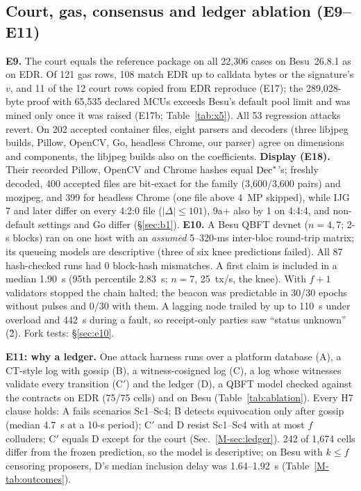 \documentclass[10pt]{article}
\newcommand{\mainref}[1]{\ref{M-#1}}
\begin{document}
\subsection{Court, gas, consensus and ledger ablation (E9--E11)}
\textbf{E9.} The court equals the reference package on all 22,306 cases on Besu~26.8.1 as on EDR. Of 121 gas rows, 108 match EDR up to calldata bytes or the
signature's $v$, and 11 of the 12 court rows copied from EDR reproduce (E17); the 289,028-byte proof with 65,535 declared MCUs exceeds Besu's default pool limit and was mined only once
it was raised (E17b; Table~\ref{tab:x5}). All 53 regression attacks revert. On 202 accepted container files, eight parsers and decoders (three libjpeg builds,
Pillow, OpenCV, Go, headless Chrome, our parser) agree on dimensions and components, the libjpeg builds also on the coefficients. \textbf{Display (E18).} Their recorded Pillow,
OpenCV and Chrome hashes equal $\mathrm{Dec}^{*}$'s; freshly decoded, 400 accepted files are bit-exact for the  family
(3,600/3,600 pairs) and mozjpeg, and 399 for headless Chrome (one file above 4~MP skipped), while IJG 7 and later differ on every 4:2:0 file ($|\Delta|\le101$), 9a+ also by 1 on 4:4:4, and non-default
settings and Go differ (\S\ref{sec:b1}).
\textbf{E10.} A Besu QBFT devnet ($n=4,7$; 2-s blocks) ran on one host with an \emph{assumed} 5--320-ms inter-bloc
round-trip matrix; its queueing models are descriptive (three of six knee predictions
failed). All 87 hash-checked runs had 0 block-hash mismatches. A first claim is included in a median 1.90~s (95th
percentile 2.83~s; $n=7$, 25~tx/s, the knee). With $f+1$ validators stopped the chain halted; the beacon was predictable
in 30/30 epochs without pulses and 0/30 with them. A lagging node trailed by up to 110~s under overload and 442~s
during a fault, so receipt-only parties saw ``status unknown'' (\G{2}). Fork tests: \S\ref{sec:e10}.

\textbf{E11: why a ledger.} One attack harness runs over a platform database (A), a CT-style log with gossip (B), a witness-cosigned log (C), a log
whose witnesses validate every transition (C$'$) and the \sys{} ledger (D), a QBFT model checked against the contracts
on EDR (75/75 cells) and on Besu (Table~\ref{tab:ablation}).
Every H7 clause holds: A fails scenarios Sc1--Sc4; B detects equivocation only after gossip (median 4.7~s at a 10-s period); C$'$
and D resist Sc1--Sc4 with at most $f$ colluders; C$'$ equals D except for the court (Sec.~\mainref{sec:ledger}). 242 of 1,674 cells differ from the frozen prediction, so the model is descriptive; on Besu with $k\le f$ censoring
proposers, D's median inclusion delay was 1.64--1.92~s (Table~\mainref{tab:outcomes}).
\end{document}
